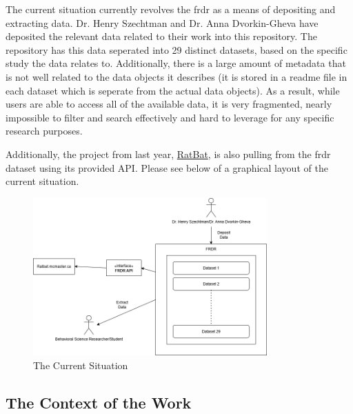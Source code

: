 \documentclass[12pt]{article}
\begin{document}
\par{ The current situation currently revolves the \gls{frdr} as a means
of depositing and extracting data. Dr. Henry Szechtman and Dr. Anna Dvorkin-Gheva have
deposited the relevant data related to their work into this repository. The repository
has this data seperated into 29 distinct datasets, based on the specific study the data relates to.
Additionally, there is a large amount of metadata that is not well related to the data objects it describes
(it is stored in a readme file in each dataset which is seperate from the actual data objects). As a result, while
users are able to access all of the available data, it is very fragmented, nearly impossible to filter and search
effectively and hard to leverage for any specific research purposes. \newline\newline

Additionally, the project from last year, \href{https://ratbat.mcmaster.ca}{RatBat}, is also pulling from the \gls{frdr}
dataset using its provided API. Please see below of a graphical layout of the current situation.}

\begin{figure}[H]
    \centering
    \includegraphics[width=0.8\textwidth]{6.1 Current Situation.png}
    \caption{The Current Situation}
    \label{fig:myimage}
\end{figure}


\subsection{The Context of the Work}
\end{document}
